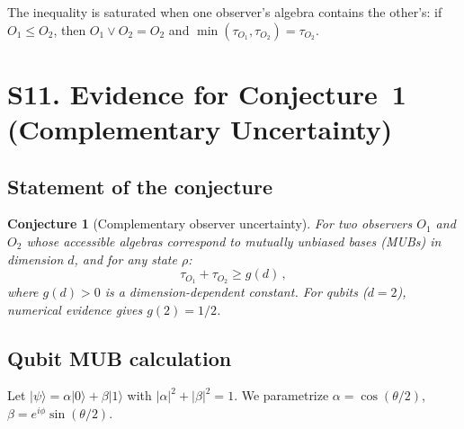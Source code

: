 \documentclass[aps,prd,preprint,superscriptaddress,longbibliography]{revtex4-2}
\newtheorem{conjecture}[theorem]{Conjecture}
\newcommand{\ket}[1]{|#1\rangle}
\newcommand{\tauasym}{\tau}
\begin{document}
The inequality is saturated when one observer's algebra contains the
other's: if $O_1 \leq O_2$, then
$O_1 \vee O_2 = O_2$ and
$\min(\tauasym_{O_1},\tauasym_{O_2}) = \tauasym_{O_2}$.

\section{S11. Evidence for Conjecture~1 (Complementary Uncertainty)}
\label{sec:conjecture}

\subsection{Statement of the conjecture}

\begin{conjecture}[Complementary observer uncertainty]
\label{conj:comp_full}
For two observers $O_1$ and $O_2$ whose accessible algebras correspond
to mutually unbiased bases (MUBs) in dimension $d$, and for any
state $\rho$:
\begin{equation}
  \tauasym_{O_1} + \tauasym_{O_2} \geq g(d)\,,
  \label{eq:comp_full}
\end{equation}
where $g(d) > 0$ is a dimension-dependent constant.  For qubits
($d=2$), numerical evidence gives $g(2) = 1/2$.
\end{conjecture}

\subsection{Qubit MUB calculation}

Let $\ket{\psi} = \alpha\ket{0} + \beta\ket{1}$ with
$|\alpha|^2 + |\beta|^2 = 1$.  We parametrize
$\alpha = \cos(\theta/2)$, $\beta = e^{i\phi}\sin(\theta/2)$.
\end{document}
